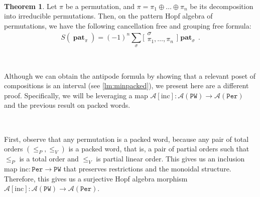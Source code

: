 \documentclass[12pt, reqno]{amsart}
\theoremstyle{definition}
\newtheorem{thm}{Theorem}[section]
\DeclareMathOperator{\pat}{\mathbf{pat}}
\begin{document}
\

\begin{thm}\label{thm:antipode_perms}
Let $\pi $ be a permutation, and $\pi = \pi_1 \oplus \dots \oplus \pi_n$ be its decomposition into irreducible permutations.
Then, on the pattern Hopf algebra of permutations, we have the following cancellation free and grouping free formula:
$$S(\pat_{\pi}) = (-1)^n \sum_{\sigma} \bigl[\!\begin{smallmatrix} \sigma \\ \pi_1, \dots, \pi_n \end{smallmatrix}\!\bigr] \pat_{\sigma} \, .$$
\end{thm}

\

Although we can obtain the antipode formula by showing that a relevant poset of compositions is an interval (see \cref{lm:minpacked}), we present here are a different proof.
Specifically, we will be leveraging a map $\mathcal A[\mathrm{inc}]: \mathcal A(\mathtt{PW}) \to \mathcal A(\mathtt{Per})$ and the previous result on packed words.

\

First, observe that any permutation is a packed word, because any pair of total orders $(\leq_P, \leq_V)$ is a packed word, that is, a pair of partial orders such that $\leq_P$ is a total order and $\leq_V$ is partial linear order.
This gives us an inclusion map $\mathrm{inc} : \mathtt{Per} \to \mathtt{PW}$ that preserves restrictions and the monoidal structure.
Therefore, this gives us a surjective Hopf algebra morphism $\mathcal A[\mathrm{inc}]: \mathcal A(\mathtt{PW}) \to \mathcal A(\mathtt{Per})$.
\end{document}
